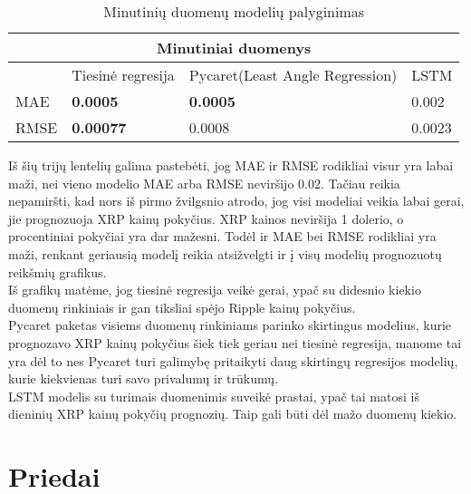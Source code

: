 \documentclass[12pt,a4paper]{article}
\begin{document}
\begin{table}[h!]
\begin{center}
\caption{Minutinių duomenų modelių palyginimas}
\begin{tabular}{ |p{2cm}||p{3cm}|p{4cm}|p{3cm}|  }
 \hline
 \multicolumn{4}{|c|}{Minutiniai duomenys} \\
 \hline
 & Tiesinė regresija & Pycaret(Least Angle Regression) & LSTM \\
 \hline
 MAE & \textbf{0.0005} & \textbf{0.0005} & 0.002\\
 RMSE & \textbf{0.00077} & 0.0008 & 0.0023\\
 \hline
\end{tabular}
\end{center}
\end{table}

Iš šių trijų lentelių galima pastebėti, jog MAE ir RMSE rodikliai visur yra labai maži, nei vieno modelio MAE arba RMSE neviršijo 0.02. Tačiau reikia nepamiršti, kad nors iš pirmo žvilgsnio atrodo, jog visi modeliai veikia labai gerai, jie prognozuoja XRP kainų pokyčius. XRP kainos neviršija 1 dolerio, o procentiniai pokyčiai yra dar mažesni. Todėl ir MAE bei RMSE rodikliai yra maži, renkant geriausią modelį reikia atsižvelgti ir į visų modelių prognozuotų reikšmių grafikus.\\
Iš grafikų matėme, jog tiesinė regresija veikė gerai, ypač su didesnio kiekio duomenų rinkiniais ir gan tiksliai spėjo Ripple kainų pokyčius.\\
Pycaret paketas visiems duomenų rinkiniams parinko skirtingus modelius, kurie prognozavo XRP kainų pokyčius šiek tiek geriau nei tiesinė regresija, manome tai yra dėl to nes Pycaret turi galimybę pritaikyti daug skirtingų regresijos modelių, kurie kiekvienas turi savo privalumų ir trūkumų. \\
LSTM modelis su turimais duomenimis suveikė prastai, ypač tai matosi iš dieninių XRP kainų pokyčių prognozių. Taip gali būti dėl mažo duomenų kiekio.

\newpage
\clearpage

\section{Priedai}
\end{document}

